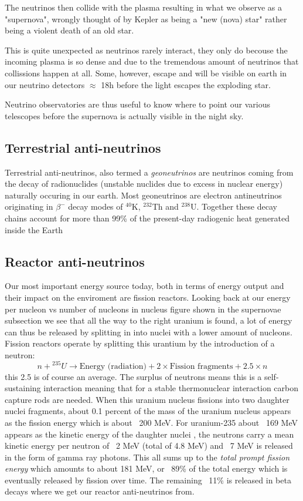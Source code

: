 \documentclass[11pt,a4paper,faculty=we,language=en,doctype=report]{cls/ugent-doc}
\begin{document}
The neutrinos then collide with the plasma resulting in what we observe as a
"supernova", wrongly thought of by Kepler as being a "new (nova) star" rather
being a violent death of an old star.

This is quite unexpected as neutrinos rarely interact, they only do becouse the
incoming plasma is so dense and due to the tremendous amount of neutrinos that
collissions happen at all. Some, however, escape and will be visible on earth
in our neutrino detectors $\approx$ 18h before the light escapes the exploding
star.

Neutrino observatories are thus useful to know where to point our various
telescopes before the supernova is actually visible in the night sky.
\subsection{Terrestrial anti-neutrinos}
Terrestrial anti-neutrinos, also termed a \textit{geoneutrinos} are neutrinos
coming from the decay of radionuclides (unstable nuclides due to excess in
nuclear energy) naturally occuring in our earth.  Most geoneutrinos are
electron antineutrinos originating in $\beta^-$ decay modes of ${}^{40}$K,
${}^{232}$Th and ${}^{238}$U. Together these decay chains account for more than
99\% of the present-day radiogenic heat generated inside the Earth

\subsection{Reactor anti-neutrinos}
Our most important energy source today, both in terms of energy output and
their impact on the enviroment are fission reactors.
Looking back at our energy per nucleon vs number of nucleons in nucleus figure shown in the
supernovae subsection we see that all the way to the right uranium is found, a lot of energy
can thus be released by splitting in into nuclei with a lower amount of nucleons.
Fission reactors operate by splitting this urantium by the introduction of a neutron:
\begin{equation}
	n + {}^{235}U \rightarrow \text{Energy (radiation)} + 2\times\text{Fission fragments} + 2.5\times n
\end{equation}
this 2.5 is of course an average. The surplus of neutrons means this is a self-sustaining
interaction meaning that for a stable thermonuclear interaction carbon capture rods
are needed.
When this uranium nucleus fissions into two daughter nuclei fragments, about 0.1
percent of the mass of the uranium nucleus appears as the fission energy which is about
~200 MeV. For uranium-235 about ~169 MeV appears as the kinetic energy of the daughter nuclei
, the neutrons carry a mean kinetic energy per neutron of ~2 MeV
(total of 4.8 MeV) and ~7 MeV is released in the form of gamma ray photons.
This all sums up to the \textit{total prompt fission energy} which amounts to about 181 MeV, 
or ~89\% of the total
energy which is eventually released by fission over time. The remaining ~11\% is
released in beta decays where we get our reactor anti-neutrinos from.
\end{document}
